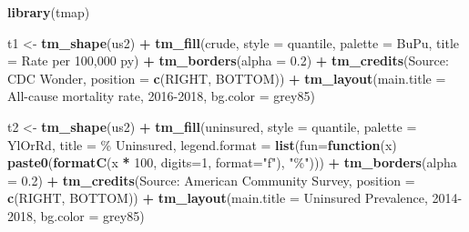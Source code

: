 \documentclass[
]{book}
\newenvironment{Shaded}{\begin{snugshade}}{\end{snugshade}}
\newcommand{\AttributeTok}[1]{\textcolor[rgb]{0.13,0.29,0.53}{#1}}
\newcommand{\ControlFlowTok}[1]{\textcolor[rgb]{0.13,0.29,0.53}{\textbf{#1}}}
\newcommand{\DecValTok}[1]{\textcolor[rgb]{0.00,0.00,0.81}{#1}}
\newcommand{\FloatTok}[1]{\textcolor[rgb]{0.00,0.00,0.81}{#1}}
\newcommand{\FunctionTok}[1]{\textcolor[rgb]{0.13,0.29,0.53}{\textbf{#1}}}
\newcommand{\NormalTok}[1]{#1}
\newcommand{\OtherTok}[1]{\textcolor[rgb]{0.56,0.35,0.01}{#1}}
\newcommand{\SpecialCharTok}[1]{\textcolor[rgb]{0.81,0.36,0.00}{\textbf{#1}}}
\newcommand{\StringTok}[1]{\textcolor[rgb]{0.31,0.60,0.02}{#1}}
\begin{document}
\begin{Shaded}
\begin{Highlighting}[]
\FunctionTok{library}\NormalTok{(tmap)}

\NormalTok{t1 }\OtherTok{\textless{}{-}} \FunctionTok{tm\_shape}\NormalTok{(us2) }\SpecialCharTok{+} 
  \FunctionTok{tm\_fill}\NormalTok{(}\StringTok{\textquotesingle{}crude\textquotesingle{}}\NormalTok{,}
          \AttributeTok{style =} \StringTok{\textquotesingle{}quantile\textquotesingle{}}\NormalTok{,}
          \AttributeTok{palette =} \StringTok{\textquotesingle{}BuPu\textquotesingle{}}\NormalTok{,}
          \AttributeTok{title =} \StringTok{\textquotesingle{}Rate per 100,000 py\textquotesingle{}}\NormalTok{) }\SpecialCharTok{+} 
  \FunctionTok{tm\_borders}\NormalTok{(}\AttributeTok{alpha =} \FloatTok{0.2}\NormalTok{) }\SpecialCharTok{+}
\FunctionTok{tm\_credits}\NormalTok{(}\StringTok{\textquotesingle{}Source: CDC Wonder\textquotesingle{}}\NormalTok{,}
           \AttributeTok{position =} \FunctionTok{c}\NormalTok{(}\StringTok{\textquotesingle{}RIGHT\textquotesingle{}}\NormalTok{, }\StringTok{\textquotesingle{}BOTTOM\textquotesingle{}}\NormalTok{)) }\SpecialCharTok{+} 
\FunctionTok{tm\_layout}\NormalTok{(}\AttributeTok{main.title =} \StringTok{\textquotesingle{}All{-}cause mortality rate, 2016{-}2018\textquotesingle{}}\NormalTok{,}
          \AttributeTok{bg.color =} \StringTok{\textquotesingle{}grey85\textquotesingle{}}\NormalTok{)}

\NormalTok{t2 }\OtherTok{\textless{}{-}} \FunctionTok{tm\_shape}\NormalTok{(us2) }\SpecialCharTok{+} 
  \FunctionTok{tm\_fill}\NormalTok{(}\StringTok{\textquotesingle{}uninsured\textquotesingle{}}\NormalTok{,}
          \AttributeTok{style =} \StringTok{\textquotesingle{}quantile\textquotesingle{}}\NormalTok{,}
          \AttributeTok{palette =} \StringTok{\textquotesingle{}YlOrRd\textquotesingle{}}\NormalTok{,}
          \AttributeTok{title =} \StringTok{\textquotesingle{}\% Uninsured\textquotesingle{}}\NormalTok{,}
          \AttributeTok{legend.format =} \FunctionTok{list}\NormalTok{(}\AttributeTok{fun=}\ControlFlowTok{function}\NormalTok{(x) }\FunctionTok{paste0}\NormalTok{(}\FunctionTok{formatC}\NormalTok{(x }\SpecialCharTok{*} \DecValTok{100}\NormalTok{, }
                                                              \AttributeTok{digits=}\DecValTok{1}\NormalTok{, }
                                                              \AttributeTok{format=}\StringTok{"f"}\NormalTok{), }\StringTok{"\%"}\NormalTok{))) }\SpecialCharTok{+}
  \FunctionTok{tm\_borders}\NormalTok{(}\AttributeTok{alpha =} \FloatTok{0.2}\NormalTok{) }\SpecialCharTok{+}
\FunctionTok{tm\_credits}\NormalTok{(}\StringTok{\textquotesingle{}Source: American Community Survey\textquotesingle{}}\NormalTok{,}
           \AttributeTok{position =} \FunctionTok{c}\NormalTok{(}\StringTok{\textquotesingle{}RIGHT\textquotesingle{}}\NormalTok{, }\StringTok{\textquotesingle{}BOTTOM\textquotesingle{}}\NormalTok{)) }\SpecialCharTok{+} 
\FunctionTok{tm\_layout}\NormalTok{(}\AttributeTok{main.title =} \StringTok{\textquotesingle{}Uninsured Prevalence, 2014{-}2018\textquotesingle{}}\NormalTok{,}
          \AttributeTok{bg.color =} \StringTok{\textquotesingle{}grey85\textquotesingle{}}\NormalTok{)}



\end{Highlighting}
\end{Shaded}
\end{document}
